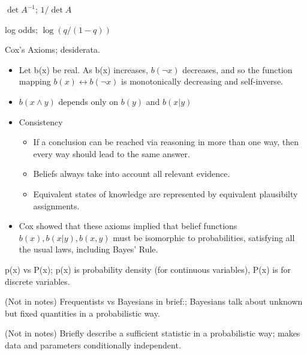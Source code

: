 \documentclass{article}
\begin{document}
$\det A^{-1}$; $1/\det A$

log odds; $\log(q/(1-q))$

Cox's Axioms; desiderata. \begin{itemize} \item Let b(x) be real. As b(x) increases, $b(\neg x)$ decreases, and so the function mapping $b(x) \leftrightarrow b(\neg x)$ is monotonically decreasing and self-inverse.  \item $b(x \wedge y)$ depends only on $b(y)$ and $b(x|y)$ \item Consistency \begin{itemize} \item If a conclusion can be reached via reasoning in more than one way, then every way should lead to the same answer.  \item Beliefs always take into account all relevant evidence.  \item Equivalent states of knowledge are represented by equivalent plausibilty assignments.  \end{itemize} \item Cox showed that these axioms implied that belief functions $b(x), b(x|y), b(x,y)$ must be isomorphic to probabilities, satisfying all the usual laws, including Bayes' Rule.  \end{itemize} 
            
p(x) vs P(x); p(x) is probability density (for continuous variables), P(x) is for discrete variables.

(Not in notes) Frequentists vs Bayesians in brief:; Bayesians talk about unknown but fixed quantities in a probabilistic way.

(Not in notes) Briefly describe a sufficient statistic in a probabilistic way; makes data and parameters conditionally independent.
\end{document}
